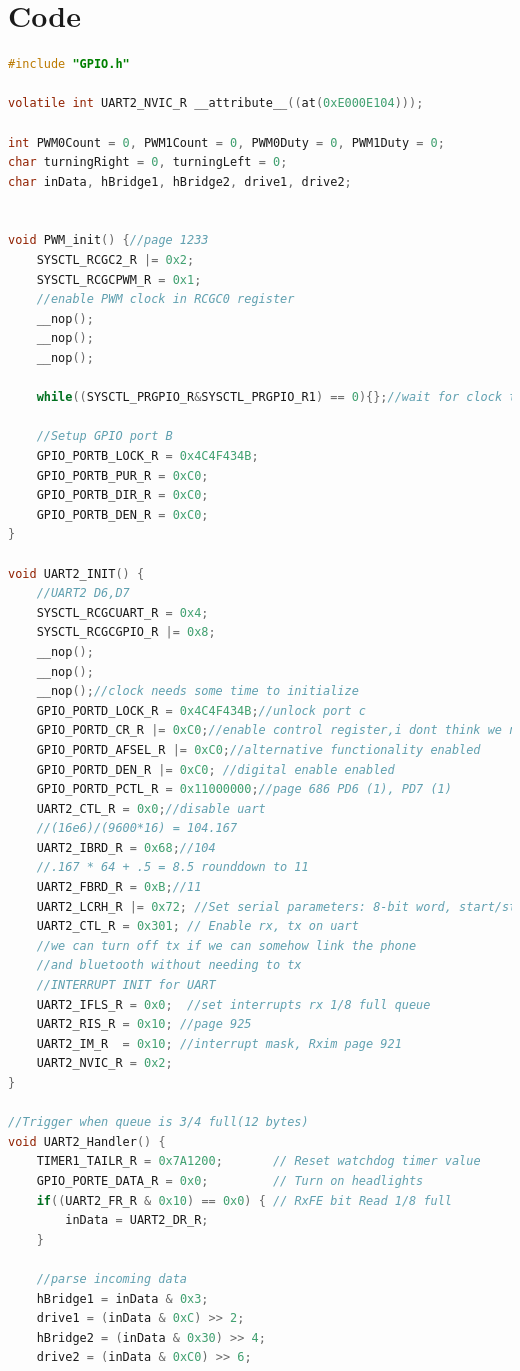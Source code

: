 \documentclass[12pt]{article}
\begin{document}
\section{Code}
\begin{lstlisting}[language=c]
#include "GPIO.h"

volatile int UART2_NVIC_R __attribute__((at(0xE000E104)));

int PWM0Count = 0, PWM1Count = 0, PWM0Duty = 0, PWM1Duty = 0;
char turningRight = 0, turningLeft = 0;
char inData, hBridge1, hBridge2, drive1, drive2;


void PWM_init() {//page 1233
	SYSCTL_RCGC2_R |= 0x2;
	SYSCTL_RCGCPWM_R = 0x1;
	//enable PWM clock in RCGC0 register
	__nop();
	__nop();
	__nop();

	while((SYSCTL_PRGPIO_R&SYSCTL_PRGPIO_R1) == 0){};//wait for clock to stabilize

	//Setup GPIO port B
	GPIO_PORTB_LOCK_R = 0x4C4F434B;
	GPIO_PORTB_PUR_R = 0xC0;
	GPIO_PORTB_DIR_R = 0xC0;
	GPIO_PORTB_DEN_R = 0xC0;
}

void UART2_INIT() {
	//UART2 D6,D7
	SYSCTL_RCGCUART_R = 0x4;
	SYSCTL_RCGCGPIO_R |= 0x8;
	__nop();
	__nop();
	__nop();//clock needs some time to initialize
	GPIO_PORTD_LOCK_R = 0x4C4F434B;//unlock port c
	GPIO_PORTD_CR_R |= 0xC0;//enable control register,i dont think we need this
	GPIO_PORTD_AFSEL_R |= 0xC0;//alternative functionality enabled
	GPIO_PORTD_DEN_R |= 0xC0; //digital enable enabled
	GPIO_PORTD_PCTL_R = 0x11000000;//page 686 PD6 (1), PD7 (1)
	UART2_CTL_R = 0x0;//disable uart
	//(16e6)/(9600*16) = 104.167
	UART2_IBRD_R = 0x68;//104
	//.167 * 64 + .5 = 8.5 rounddown to 11 
	UART2_FBRD_R = 0xB;//11
	UART2_LCRH_R |= 0x72; //Set serial parameters: 8-bit word, start/stop/parity bits
	UART2_CTL_R = 0x301; // Enable rx, tx on uart
	//we can turn off tx if we can somehow link the phone
	//and bluetooth without needing to tx
	//INTERRUPT INIT for UART
	UART2_IFLS_R = 0x0;  //set interrupts rx 1/8 full queue 
	UART2_RIS_R = 0x10; //page 925
	UART2_IM_R  = 0x10; //interrupt mask, Rxim page 921
	UART2_NVIC_R = 0x2;
}

//Trigger when queue is 3/4 full(12 bytes)
void UART2_Handler() { 
	TIMER1_TAILR_R = 0x7A1200;       // Reset watchdog timer value    
	GPIO_PORTE_DATA_R = 0x0;         // Turn on headlights
	if((UART2_FR_R & 0x10) == 0x0) { // RxFE bit Read 1/8 full
		inData = UART2_DR_R;
	}

	//parse incoming data
	hBridge1 = inData & 0x3;
	drive1 = (inData & 0xC) >> 2;
	hBridge2 = (inData & 0x30) >> 4;
	drive2 = (inData & 0xC0) >> 6;


\end{lstlisting}
\end{document}
